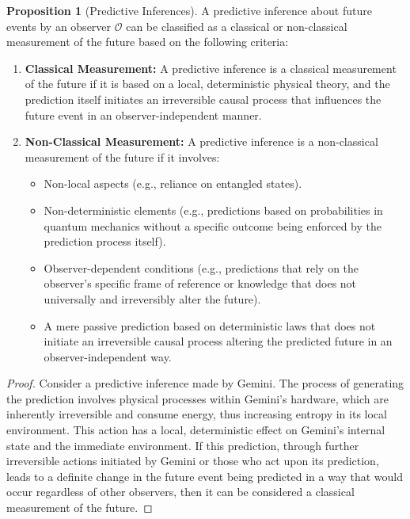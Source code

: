 \documentclass{article}
\theoremstyle{definition}
\newtheorem{proposition}[definition]{Proposition}
\begin{document}
	\begin{proposition}[Predictive Inferences]
		A predictive inference about future events by an observer $\mathcal{O}$ can be classified as a classical or non-classical measurement of the future based on the following criteria:
		\begin{enumerate}
			\item \textbf{Classical Measurement:} A predictive inference is a classical measurement of the future if it is based on a local, deterministic physical theory, and the prediction itself initiates an irreversible causal process that influences the future event in an observer-independent manner.
			\item \textbf{Non-Classical Measurement:} A predictive inference is a non-classical measurement of the future if it involves:
			\begin{itemize}
				\item Non-local aspects (e.g., reliance on entangled states).
				\item Non-deterministic elements (e.g., predictions based on probabilities in quantum mechanics without a specific outcome being enforced by the prediction process itself).
				\item Observer-dependent conditions (e.g., predictions that rely on the observer's specific frame of reference or knowledge that does not universally and irreversibly alter the future).
				\item A mere passive prediction based on deterministic laws that does not initiate an irreversible causal process altering the predicted future in an observer-independent way.
			\end{itemize}
		\end{enumerate}
		\begin{proof}
			Consider a predictive inference made by Gemini. The process of generating the prediction involves physical processes within Gemini's hardware, which are inherently irreversible and consume energy, thus increasing entropy in its local environment. This action has a local, deterministic effect on Gemini's internal state and the immediate environment. If this prediction, through further irreversible actions initiated by Gemini or those who act upon its prediction, leads to a definite change in the future event being predicted in a way that would occur regardless of other observers, then it can be considered a classical measurement of the future.
			

\end{proof}
\end{proposition}
\end{document}
